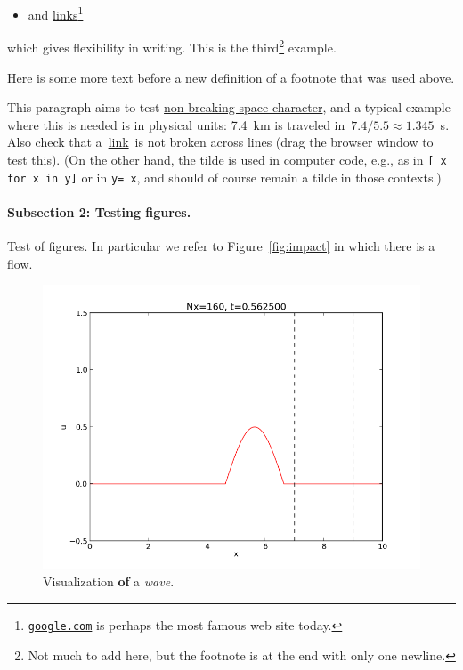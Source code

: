 \documentclass[%
oneside,                 %
final,                   %
10pt]{article}
\newenvironment{notice_mdfboxadmon}[1][]{
\begin{notice_mdfboxmdframed}[frametitle=#1]
}
{
\end{notice_mdfboxmdframed}
}
\theoremstyle{definition}
\begin{document}
\begin{enumerate}
\begin{itemize}
 \item and \href{{https://google.com}}{links}\footnote{\href{{google.com}}{\nolinkurl{google.com}} is perhaps the most famous web site today.}
\end{itemize}

\noindent
which gives flexibility in writing.
This is the third\footnote{Not much to add here, but the footnote is at the end with only one newline.} example.

Here is some more text before a new definition of a footnote that was
used above.


\begin{notice_mdfboxadmon}
This paragraph aims to test \href{{https://en.wikipedia.org/wiki/Non-breaking_space}}{non-breaking space character}, and a typical
example where this is needed is in physical units: 7.4~km is traveled
in~$7.4/5.5\approx 1.345$~s.  Also check that a~\href{{https://google.com}}{link}~is
not broken across lines (drag the browser window to test this).
(On the other hand, the tilde is used in
computer code, e.g., as in \texttt{[~x for x in y]} or in \texttt{y=~x}, and should
of course remain a tilde in those contexts.)
\end{notice_mdfboxadmon} %



\paragraph{Subsection 2: Testing figures.}
\label{subsec:ex}

Test of figures. In particular we refer to Figure~\vref{fig:impact} in which
there is a flow.

\begin{figure}[!ht]  %
  \centerline{\includegraphics[width=0.9\linewidth]{testfigs/wave1D.png}}
  \caption{
  Visualization \textbf{of} a \emph{wave}. \label{fig:impact}
  }
\end{figure}


\end{enumerate}
\end{document}
